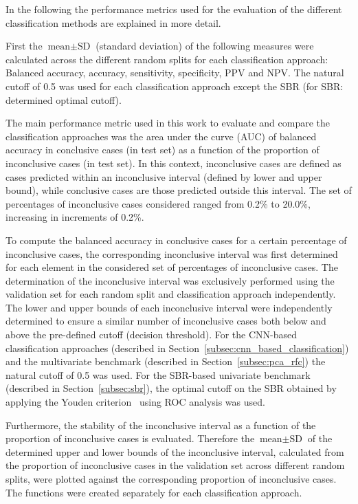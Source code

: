 In the following the performance metrics used for the evaluation of the different classification methods 
are explained in more detail.

First the $\text{mean} \pm \text{SD}$ (standard deviation) of the following measures were calculated across
the different random splits for each classification approach: 
Balanced accuracy, accuracy, sensitivity, specificity, PPV and NPV.
The natural cutoff of 0.5 was used for each classification approach except the SBR (for SBR: determined optimal cutoff).

The main performance metric used in this work to evaluate and compare the classification approaches was 
the area under the curve (AUC) of balanced accuracy in conclusive cases (in test set) as a function of 
the proportion of inconclusive cases (in test set).
In this context, inconclusive cases are defined as cases predicted within an inconclusive interval 
(defined by lower and upper bound), while conclusive cases are those predicted outside this interval.
The set of percentages of inconclusive cases considered ranged from 0.2\% to 20.0\%, increasing in increments of 0.2\%.

To compute the balanced accuracy in conclusive cases for a certain percentage of inconclusive cases, 
the corresponding inconclusive interval was first determined 
for each element in the considered set of percentages of inconclusive cases.
The determination of the inconclusive interval was exclusively performed using the validation set 
for each random split and classification approach independently.
The lower and upper bounds of each inconclusive interval were independently determined
to ensure a similar number of inconclusive cases both below and above the pre-defined cutoff (decision threshold).
For the CNN-based classification approaches (described in Section~\ref{subsec:cnn_based_classification}) and the 
multivariate benchmark (described in Section~\ref{subsec:pca_rfc}) the natural cutoff of 0.5 was used.
For the SBR-based univariate benchmark (described in Section~\ref{subsec:sbr}), 
the optimal cutoff on the SBR obtained by applying the Youden criterion~\citep{Youden1950} using ROC analysis was used.


Furthermore, the stability of the inconclusive interval as a function of the proportion of inconclusive cases is evaluated.
Therefore the $\text{mean} \pm \text{SD}$ of the determined upper and lower bounds of the inconclusive interval, 
calculated from the proportion of inconclusive cases in the validation set across different random splits, 
were plotted against the corresponding proportion of inconclusive cases.
The functions were created separately for each classification approach.

